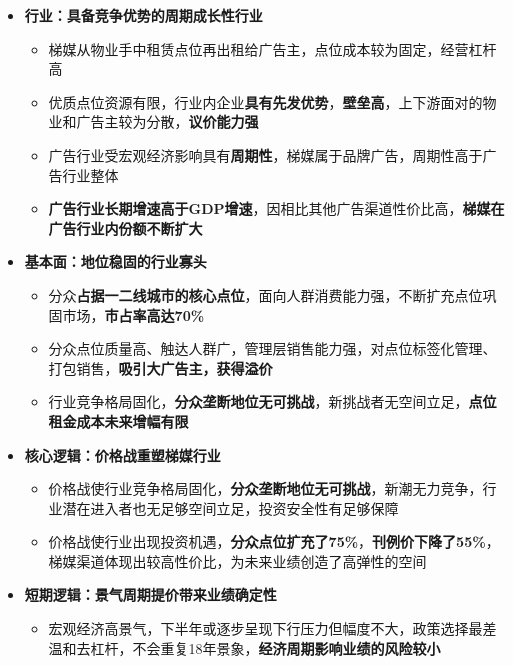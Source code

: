   \begin{itemize}[leftmargin=*]
    \item
      \textbf{行业：具备竞争优势的周期成长性行业}
      {\small
      \begin{itemize}
        \item 梯媒从物业手中租赁点位再出租给广告主，点位成本较为固定，经营杠杆高
        \item 优质点位资源有限，行业内企业\textbf{具有先发优势}，\textbf{壁垒高}，上下游面对的物业和广告主较为分散，\textbf{议价能力强}
        \item 广告行业受宏观经济影响具有\textbf{周期性}，梯媒属于品牌广告，周期性高于广告行业整体
        \item\textbf{ 广告行业长期增速高于GDP增速}，因相比其他广告渠道性价比高，\textbf{梯媒在广告行业内份额不断扩大}
      \end{itemize}
      }
    \item
      \textbf{基本面：地位稳固的行业寡头}
      {\small
      \begin{itemize}
        \item 分众\textbf{占据一二线城市的核心点位}，面向人群消费能力强，不断扩充点位巩固市场，\textbf{市占率高达70\%}
        \item 分众点位质量高、触达人群广，管理层销售能力强，对点位标签化管理、打包销售，\textbf{吸引大广告主，获得溢价}
        \item 行业竞争格局固化，\textbf{分众垄断地位无可挑战}，新挑战者无空间立足，\textbf{点位租金成本未来增幅有限}
      \end{itemize}
      }
      \item
      \textbf{核心逻辑：价格战重塑梯媒行业}
      {\small
      \begin{itemize}
        \item 价格战使行业竞争格局固化，\textbf{分众垄断地位无可挑战}，新潮无力竞争，行业潜在进入者也无足够空间立足，投资安全性有足够保障
        \item 价格战使行业出现投资机遇，\textbf{分众点位扩充了75\%}，\textbf{刊例价下降了55\%}，梯媒渠道体现出较高性价比，为未来业绩创造了高弹性的空间
      \end{itemize}
      }
    \item
      \textbf{短期逻辑：景气周期提价带来业绩确定性}
      {\small
      \begin{itemize}
        \item 宏观经济高景气，下半年或逐步呈现下行压力但幅度不大，政策选择最差温和去杠杆，不会重复18年景象，\textbf{经济周期影响业绩的风险较小}

\end{itemize}}
\end{itemize}
